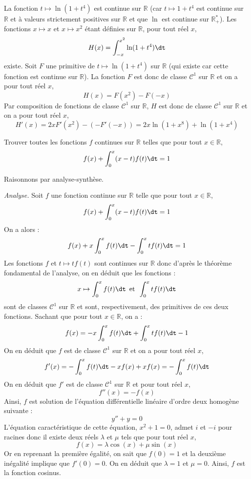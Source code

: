 \documentclass[a4paper,10pt]{report}
\begin{document}
\corr La fonction $t \mapsto \ln(1+t^4)$ est continue sur $\mathbb{R}$ (car $t \mapsto 1+t^4$ est continue sur $\mathbb{R}$ et à valeurs strictement positives sur $\mathbb{R}$ et que $\ln$ est continue sur $\mathbb{R}_+^{*}$). Les fonctions $x \mapsto x$ et $x \mapsto x^2$ étant définies sur $\mathbb{R}$, pour tout réel $x$,
$$ H(x) = \int_{-x}^{x^2} \ln(1+t^4) \dt$$
existe. Soit $F$ une primitive de $t \mapsto \ln(1+t^4)$ sur $\mathbb{R}$ (qui existe car cette fonction est continue sur $\mathbb{R}$). La fonction $F$ est donc de classe $\mathcal{C}^1$ sur $\mathbb{R}$ et on a pour tout réel $x$,
$$ H(x) = F(x^2)-F(-x)$$
Par composition de fonctions de classe $\mathcal{C}^1$ sur $\mathbb{R}$, $H$ est donc de classe $\mathcal{C}^1$ sur $\mathbb{R}$ et on a pour tout réel $x$,
$$ H'(x) = 2x F'(x^2)-(-F'(-x)) = 2x \ln(1+x^8)+ \ln(1+x^4)$$


\begin{Exa} Trouver toutes les fonctions $f$ continues sur $\mathbb{R}$ telles que pour tout $x \in \mathbb{R}$,
$$ f(x) + \int_{0}^x (x-t)f(t) \dt =1$$
\end{Exa} 

\corr Raisonnons par analyse-synthèse.

\medskip

\noindent \textit{Analyse.} Soit $f$ une fonction continue sur $\mathbb{R}$ telle que pour tout $x \in \mathbb{R}$,
$$ f(x) + \int_{0}^x (x-t)f(t) \dt =1$$
On a alors :
$$ f(x) + x \int_0^x f(t) \dt - \int_0^x t f(t) \dt = 1$$
Les fonctions $f$ et $t \mapsto t f(t)$ sont continues sur $\mathbb{R}$ donc d'après le théorème fondamental de l'analyse, on en déduit que les fonctions :
$$x \mapsto \int_0^x f(t) \dt \, \hbox{ et } \, \int_0^x tf(t) \dt$$ 
sont de classes $\mathcal{C}^1$ sur $\mathbb{R}$ et sont, respectivement, des primitives de ces deux fonctions. Sachant que pour tout $x \in \mathbb{R}$, on a :
$$ f(x) =  -x \int_0^x f(t) \dt + \int_0^x t f(t) \dt - 1$$
On en déduit que $f$ est de classe $\mathcal{C}^1$ sur $\mathbb{R}$ et on a pour tout réel $x$,
$$ f'(x) = - \int_0^x f(t) \dt - xf(x) + xf(x) = - \int_0^x f(t) \dt$$
On en déduit que $f'$ est de classe $\mathcal{C}^1$ sur $\mathbb{R}$ et pour tout réel $x$,
$$ f''(x) = -f(x)$$
Ainsi, $f$ est solution de l'équation différentielle linéaire d'ordre deux homogène suivante :
$$ y''+y=0$$
L'équation caractéristique de cette équation, $x^2+1=0$, admet $i$ et $-i$ pour racines donc il existe deux réels $\lambda$ et $\mu$ tels que pour tout réel $x$,
$$ f(x) = \lambda \cos(x) + \mu \sin(x)$$
Or en reprenant la première égalité, on sait que $f(0)=1$ et la deuxième inégalité implique que $f'(0)=0$. On en déduit que $\lambda=1$ et $\mu=0$. Ainsi, $f$ est la fonction cosinus.
\end{document}
